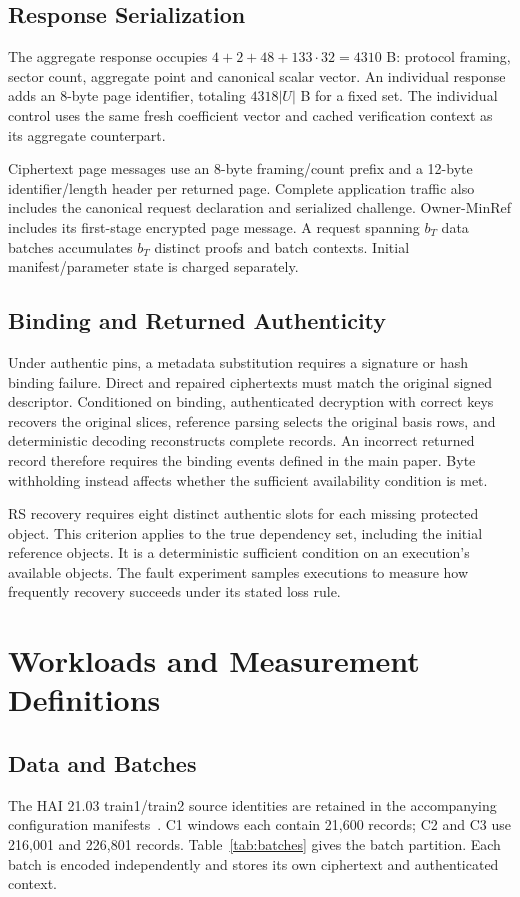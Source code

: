 \documentclass[10pt,journal,onecolumn]{IEEEtran}
\begin{document}
\subsection{Response Serialization}\label{sec:wire-format}
The aggregate response occupies $4+2+48+133\cdot32=4310$ B: protocol framing,
sector count, aggregate point and canonical scalar vector. An individual
response adds an 8-byte page identifier, totaling $4318|U|$ B for a fixed set.
The individual control uses the same fresh coefficient vector and cached
verification context as its aggregate counterpart.

Ciphertext page messages use an 8-byte framing/count prefix and a 12-byte
identifier/length header per returned page. Complete application traffic
also includes the canonical request declaration and serialized challenge.
Owner-MinRef includes its first-stage encrypted page message. A request
spanning $b_T$ data batches accumulates $b_T$ distinct proofs and batch
contexts. Initial manifest/parameter state is charged separately.

\subsection{Binding and Returned Authenticity}
Under authentic pins, a metadata substitution requires a signature or hash
binding failure. Direct and repaired ciphertexts must match the original
signed descriptor. Conditioned on binding, authenticated decryption with
correct keys recovers the original slices, reference parsing selects the
original basis rows, and deterministic decoding reconstructs complete records.
An incorrect returned record therefore requires the binding events defined
in the main paper. Byte withholding instead affects whether the sufficient
availability condition is met.

RS recovery requires eight distinct authentic slots for each missing protected
object. This criterion applies to the true dependency set, including the
initial reference objects. It is a deterministic sufficient condition on an
execution's available objects. The fault experiment samples executions to
measure how frequently recovery succeeds under its stated loss rule.

\section{Workloads and Measurement Definitions}\label{sec:key-evidence}
\subsection{Data and Batches}
The HAI 21.03 train1/train2 source identities are retained in the accompanying
configuration manifests~\cite{Shin2021HAI}. C1 windows each contain 21,600
records; C2 and C3 use 216,001 and 226,801 records. Table~\ref{tab:batches}
gives the batch partition. Each batch is encoded independently and stores
its own ciphertext and authenticated context.
\end{document}
